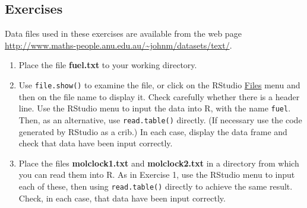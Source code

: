\subsection{Exercises}\label{ss:wd}
Data files used in these exercises are available from the web
page  \url{http://www.maths-people.anu.edu.au/~johnm/datasets/text/}.

\begin{enumerate}
\item
Place the file \textbf{fuel.txt} to your working directory.
\item Use \texttt{file.show()} to examine the file, or click on the
  RStudio \underline{Files} menu and then on the file name to display
  it.  Check carefully whether there is a header line.  Use the
  RStudio menu to input the data into R, with the name \texttt{fuel}.
  Then, as an alternative, use \texttt{read.table()} directly.  (If
  necessary use the code generated by RStudio as a crib.)  In each
  case, display the data frame and check that data have been input
  correctly.
\item {} Place the files
  \textbf{molclock1.txt} and \textbf{molclock2.txt} in a directory
  from which you can read them into R.  As in Exercise 1, use the
  RStudio menu to input each of these, then using
  \texttt{read.table()} directly to achieve the same result.  Check,
  in each case, that data have been input correctly.


\end{enumerate}
